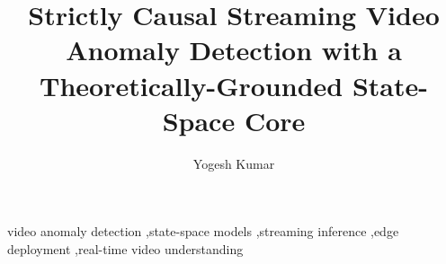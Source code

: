\documentclass[preprint,12pt]{elsarticle}
\begin{document}
\begin{frontmatter}

\title{Strictly Causal Streaming Video Anomaly Detection with a Theoretically-Grounded State-Space Core}

\author[iitj]{Yogesh Kumar}

\address[iitj]{Indian Institute of Technology Jodhpur, Jodhpur, India}



\begin{keyword}
video anomaly detection \sep state-space models \sep streaming inference \sep edge deployment \sep real-time video understanding
\end{keyword}

\end{frontmatter}

\linenumbers










\end{document}
